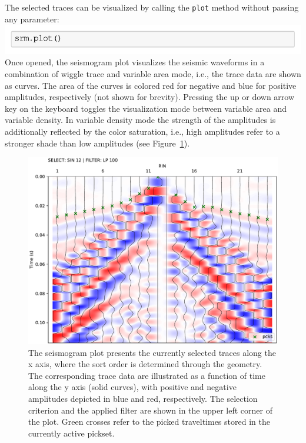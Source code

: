 \documentclass[a4paper,fleqn]{cas-sc}
\begin{document}
The selected traces can be visualized by calling the \texttt{plot} method without passing any parameter:
\newline
\includegraphics[width=.5\textwidth]{./figures/plot.pdf}
\newline
Once opened, the seismogram plot visualizes the seismic waveforms in a combination of wiggle trace and variable area mode, i.e., the trace data are shown as curves. The area of the curves is colored red for negative and blue for positive amplitudes, respectively (not shown for brevity). Pressing the up or down arrow key on the keyboard toggles the visualization mode between variable area and variable density. In variable density mode the strength of the amplitudes is additionally reflected by the color saturation, i.e., high amplitudes refer to a stronger shade than low amplitudes (see Figure~\ref{fig:srm_intro}).
\begin{figure}
	\centering
	\includegraphics[width=.75\textwidth]{figures/pickwindow_intro.pdf}
	\caption{The seismogram plot presents the currently selected traces along the x axis, where the sort order is determined through the geometry. The corresponding trace data are illustrated as a function of time along the y axis (solid curves), with positive and negative amplitudes depicted in blue and red, respectively. The selection criterion and the applied filter are shown in the upper left corner of the plot. Green crosses refer to the picked traveltimes stored in the currently active pickset.}
	\label{fig:srm_intro}
\end{figure}
\end{document}
